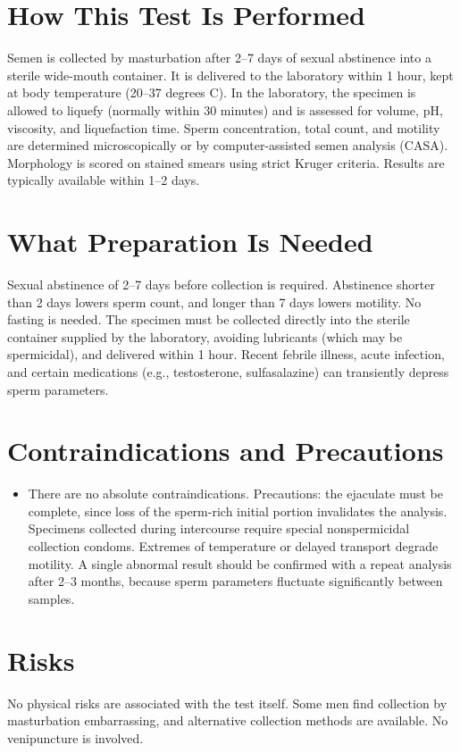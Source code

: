 \section*{How This Test Is Performed}
Semen is collected by masturbation after 2--7 days of sexual abstinence into a sterile wide-mouth container. It is delivered to the laboratory within 1 hour, kept at body temperature (20--37 degrees C). In the laboratory, the specimen is allowed to liquefy (normally within 30 minutes) and is assessed for volume, pH, viscosity, and liquefaction time. Sperm concentration, total count, and motility are determined microscopically or by computer-assisted semen analysis (CASA). Morphology is scored on stained smears using strict Kruger criteria. Results are typically available within 1--2 days.
\section*{What Preparation Is Needed}
Sexual abstinence of 2--7 days before collection is required. Abstinence shorter than 2 days lowers sperm count, and longer than 7 days lowers motility. No fasting is needed. The specimen must be collected directly into the sterile container supplied by the laboratory, avoiding lubricants (which may be spermicidal), and delivered within 1 hour. Recent febrile illness, acute infection, and certain medications (e.g., testosterone, sulfasalazine) can transiently depress sperm parameters.
\section*{Contraindications and Precautions}
\begin{itemize}
  \item There are no absolute contraindications. Precautions: the ejaculate must be complete, since loss of the sperm-rich initial portion invalidates the analysis. Specimens collected during intercourse require special nonspermicidal collection condoms. Extremes of temperature or delayed transport degrade motility. A single abnormal result should be confirmed with a repeat analysis after 2--3 months, because sperm parameters fluctuate significantly between samples.
\end{itemize}
\section*{Risks}
No physical risks are associated with the test itself. Some men find collection by masturbation embarrassing, and alternative collection methods are available. No venipuncture is involved.
